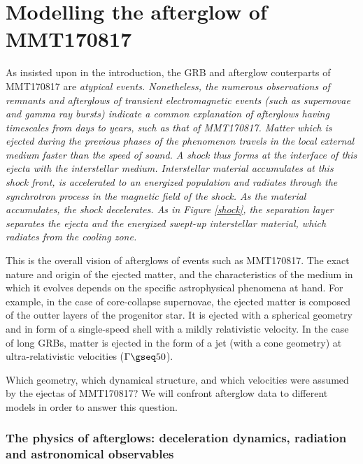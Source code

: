\part{Modelling the afterglow of MMT170817}

As insisted upon in the introduction, the GRB and afterglow couterparts of MMT170817 are \it{atypical} events. Nonetheless, the numerous observations of remnants and afterglows of transient electromagnetic events (such as supernovae and gamma ray bursts) indicate a common explanation of afterglows having timescales from days to years, such as that of MMT170817. Matter which is ejected during the previous phases of the phenomenon travels in the local external medium faster than the speed of sound. A shock thus forms at the interface of this ejecta with the interstellar medium. Interstellar material accumulates at this shock front, is accelerated to an energized population and radiates through the synchrotron process in the magnetic field of the shock. As the material accumulates, the shock decelerates. As in Figure \ref{shock}, the \it{separation layer} separates the ejecta and the energized swept-up interstellar material, which radiates from the \it{cooling zone}.

This is the overall vision of afterglows of events such as MMT170817. The exact nature and origin of the ejected matter, and the characteristics of the medium in which it evolves depends on the specific astrophysical phenomena at hand. For example, in the case of core-collapse supernovae, the ejected matter is composed of the outter layers of the progenitor star. It is ejected with a spherical geometry and in form of a single-speed shell with a mildly relativistic velocity. In the case of long GRBs, matter is ejected in the form of a jet (with a cone geometry) at ultra-relativistic velocities ($\Gamma \gseq 50$).

Which geometry, which dynamical structure, and which velocities were assumed by the ejectas of MMT170817? We will confront afterglow data to different models in order to answer this question.


\section{The physics of afterglows: deceleration dynamics, radiation and astronomical observables}

